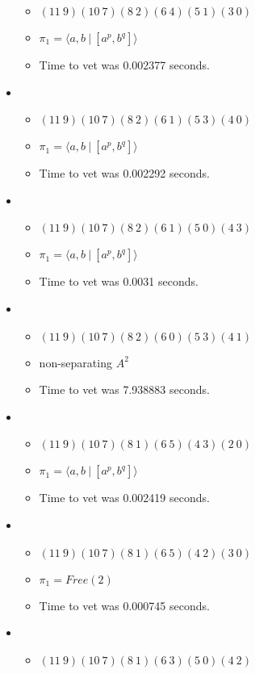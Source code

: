 \documentclass{article}
\begin{document}
\begin{itemize}
\begin{itemize}
      \item $(11\ 9)(10\ 7)(8\ 2)(6\ 4)(5\ 1)(3\ 0)$
      \item $\pi_1 = \langle a,b\ |\ [a^p,b^q]\rangle$
      \item Time to vet was 0.002377 seconds.
\end{itemize}
\item \begin{itemize}
      \item $(11\ 9)(10\ 7)(8\ 2)(6\ 1)(5\ 3)(4\ 0)$
      \item $\pi_1 = \langle a,b\ |\ [a^p,b^q]\rangle$
      \item Time to vet was 0.002292 seconds.
\end{itemize}
\item \begin{itemize}
      \item $(11\ 9)(10\ 7)(8\ 2)(6\ 1)(5\ 0)(4\ 3)$
      \item $\pi_1 = \langle a,b\ |\ [a^p,b^q]\rangle$
      \item Time to vet was 0.0031 seconds.
\end{itemize}
\item \begin{itemize}
      \item $(11\ 9)(10\ 7)(8\ 2)(6\ 0)(5\ 3)(4\ 1)$
      \item non-separating $A^2$
      \item Time to vet was 7.938883 seconds.
\end{itemize}
\item \begin{itemize}
      \item $(11\ 9)(10\ 7)(8\ 1)(6\ 5)(4\ 3)(2\ 0)$
      \item $\pi_1 = \langle a,b\ |\ [a^p,b^q]\rangle$
      \item Time to vet was 0.002419 seconds.
\end{itemize}
\item \begin{itemize}
      \item $(11\ 9)(10\ 7)(8\ 1)(6\ 5)(4\ 2)(3\ 0)$
      \item $\pi_1 =Free(2)$
      \item Time to vet was 0.000745 seconds.
\end{itemize}
\item \begin{itemize}
      \item $(11\ 9)(10\ 7)(8\ 1)(6\ 3)(5\ 0)(4\ 2)$

\end{itemize}
\end{itemize}
\end{document}
